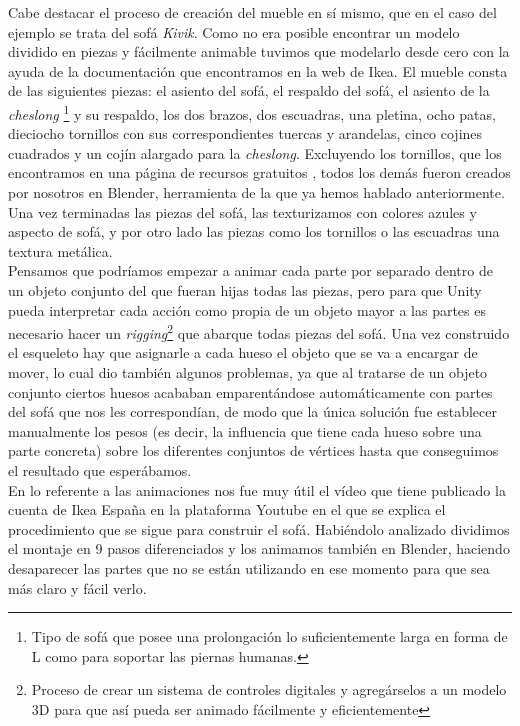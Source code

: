 Cabe destacar el proceso de creación del mueble en sí mismo, que en el caso del ejemplo se trata del sofá \textit{Kivik}. Como no era posible encontrar un modelo dividido en piezas y fácilmente animable tuvimos que modelarlo desde cero con la ayuda de la documentación que encontramos en la web de Ikea. El mueble consta de las siguientes piezas: el asiento del sofá, el respaldo del sofá, el asiento de la \textit{cheslong} \footnote{ Tipo de sofá que posee una prolongación lo suficientemente larga en forma de L como para soportar las piernas humanas.} y su respaldo, los dos brazos, dos escuadras, una pletina, ocho patas, dieciocho tornillos con sus correspondientes tuercas y arandelas, cinco cojines cuadrados y un cojín alargado para la \textit{cheslong}. Excluyendo los tornillos, que los encontramos en una página de recursos gratuitos \cite{tornillos}, todos los demás fueron creados por nosotros en Blender, herramienta de la que ya hemos hablado anteriormente. Una vez terminadas las piezas del sofá, las texturizamos con colores azules y aspecto de sofá, y por otro lado las piezas como los tornillos o las escuadras una textura metálica.\\

Pensamos que podríamos empezar a animar cada parte por separado dentro de un objeto conjunto del que fueran hijas todas las piezas, pero para que Unity pueda interpretar cada acción como propia de un objeto mayor a las partes es necesario hacer un \textit{rigging}\footnote{ Proceso de crear un sistema de controles digitales y agregárselos a un modelo 3D para que así pueda ser animado fácilmente y eficientemente} que abarque todas piezas del sofá. Una vez construido el esqueleto hay que asignarle a cada hueso el objeto que se va a encargar de mover, lo cual dio también algunos problemas, ya que al tratarse de un objeto conjunto ciertos huesos acababan emparentándose automáticamente con partes del sofá que nos les correspondían, de modo que la única solución fue establecer manualmente los pesos (es decir, la influencia que tiene cada hueso sobre una parte concreta) sobre los diferentes conjuntos de vértices hasta que conseguimos el resultado que esperábamos.\\

En lo referente a las animaciones nos fue muy útil el vídeo que tiene publicado la cuenta de Ikea España en la plataforma Youtube \cite{IkeaYT} en el que se explica el procedimiento que se sigue para construir el sofá. Habiéndolo analizado dividimos el montaje en 9 pasos diferenciados y los animamos también en Blender, haciendo desaparecer las partes que no se están utilizando en ese momento para que sea más claro y fácil verlo.\\

